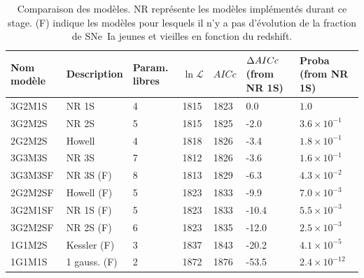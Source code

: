 \documentclass[a4paper, 12pt, svgnames]{article}
\begin{document}
\begin{table}[htbp!]
    \centering
    \captionsetup{justification=centering}
    \caption{Comparaison des modèles. NR représente les modèles implémentés
             durant ce stage. (F) indique les modèles pour lesquels il n'y a pas
             d'évolution de la fraction de SNe~Ia jeunes et vieilles en fonction
             du redshift.}
    \label{tab:comp}
    \begin{tabularx}{\linewidth}{|Y*{6}{|Y}|}\hline

         Nom modèle & Description & Param. libres &
        $\ln\mathcal{L}$ & 
        
        $AICc$ & $\Delta AICc$ (from NR 1S) & Proba (from NR 1S) \\\hline\hline

        3G2M1S & NR 1S & 4 & 1815 & 1823 & 0.0 & $1.0$ \\\hline

        3G2M2S & NR 2S & 5 & 1815  & 1825 & -2.0 & $3.6\times10^{-1}$ \\\hline

        2G2M2S & Howell & 4 & 1818  & 1826 & -3.4 & $1.8\times10^{-1}$ \\\hline

        3G3M3S & NR 3S & 7 & 1812  & 1826 & -3.6 & $1.6\times10^{-1}$ \\\hline

        3G3M3SF & NR 3S (F) & 8 & 1813 & 1829 & -6.3  & $4.3\times10^{-2}$
        \\\hline

        2G2M2SF & Howell (F) & 5 & 1823  & 1833 & -9.9 & $7.0\times10^{-3}$
        \\\hline

        3G2M1SF & NR 1S (F) & 5 & 1823  & 1833 & -10.4 & $5.5\times10^{-3}$
        \\\hline

        3G2M2SF & NR 2S (F) & 6 & 1823  & 1835 & -12.0 & $2.5\times10^{-3}$
        \\\hline

        1G1M2S & Kessler (F) & 3 & 1837  & 1843 & -20.2 & $4.1\times10^{-5}$
        \\\hline

        1G1M1S & 1 gauss. (F) & 2 & 1872 & 1876 & -53.5 &
        $2.4\times10^{-12}$\\\hline

    \end{tabularx}
\end{table}
\end{document}
